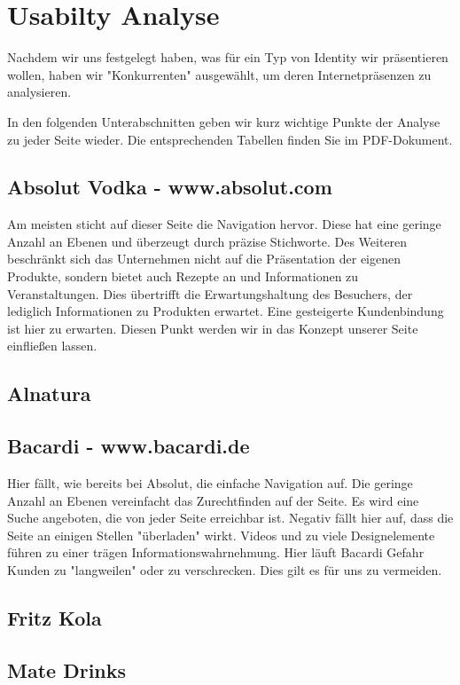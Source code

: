 \documentclass[12pt,a4paper,oneside,ngerman]{article}
\begin{document}
\newpage %
\section{Usabilty Analyse}
Nachdem wir uns festgelegt haben, was für ein Typ von Identity wir präsentieren wollen, haben wir "Konkurrenten" ausgewählt, um deren Internetpräsenzen zu analysieren. 

In den folgenden Unterabschnitten geben wir kurz wichtige Punkte der Analyse zu jeder Seite wieder. Die entsprechenden Tabellen finden Sie im PDF-Dokument. %
\subsection{Absolut Vodka - www.absolut.com}
Am meisten sticht auf dieser Seite die Navigation hervor. Diese hat eine geringe Anzahl an Ebenen und überzeugt durch präzise Stichworte. Des Weiteren beschränkt sich das Unternehmen nicht auf die Präsentation der eigenen Produkte, sondern bietet auch Rezepte an und Informationen zu Veranstaltungen. Dies übertrifft die Erwartungshaltung des Besuchers, der lediglich Informationen zu Produkten erwartet. Eine gesteigerte Kundenbindung ist hier zu erwarten. Diesen Punkt werden wir in das Konzept unserer Seite einfließen lassen.
\subsection{Alnatura}

\subsection{Bacardi - www.bacardi.de}
Hier fällt, wie bereits bei Absolut, die einfache Navigation auf. Die geringe Anzahl an Ebenen vereinfacht das Zurechtfinden auf der Seite. Es wird eine Suche angeboten, die von jeder Seite erreichbar ist. Negativ fällt hier auf, dass die Seite an einigen Stellen "überladen" wirkt. Videos und zu viele Designelemente führen zu einer trägen Informationswahrnehmung. Hier läuft Bacardi Gefahr Kunden zu "langweilen" oder zu verschrecken. Dies gilt es für uns zu vermeiden.
\subsection{Fritz Kola}

\subsection{Mate Drinks}
\end{document}
